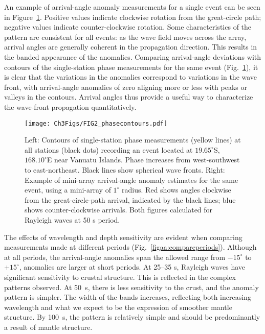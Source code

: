 \documentclass[12pt,oneside]{book}
\newcommand{\degree}[1]{\mbox{$#1^{\circ}$}}
\begin{document}
An example of arrival-angle anomaly measurements for a single event can be seen in Figure~\ref{figaa:phasecontours}. Positive values indicate clockwise rotation from the great-circle path; negative values indicate counter-clockwise rotation. Some characteristics of the pattern are consistent for all events: as the wave field moves across the array, arrival angles are generally coherent in the propagation direction. This results in the banded appearance of the anomalies. Comparing arrival-angle deviations with contours of the single-station phase measurements for the same event (Fig.~\ref{figaa:phasecontours}), it is clear that the variations in the anomalies correspond to variations in the wave front, with arrival-angle anomalies of zero aligning more or less with peaks or valleys in the contours. Arrival angles thus provide a useful way to characterize the wave-front propagation quantitatively. 

\begin{figure} 
\begin{center}
\texttt{[image: Ch3Figs/FIG2\_phasecontours.pdf]} 
\caption[Comparison of single-station phase contours and arrival-angle anomaly measurements for a single event]{Left: Contours of single-station phase measurements (yellow lines) at all stations (black dots) recording an event located at \degree{19.65}S, \degree{168.10}E near Vanuatu Islands. Phase increases from west-southwest to east-northeast. Black lines show spherical wave fronts. Right: Example of mini-array arrival-angle anomaly estimates for the same event, using a mini-array of \degree{1} radius. Red shows angles clockwise from the great-circle-path arrival, indicated by the black lines; blue shows counter-clockwise arrivals. Both figures calculated for Rayleigh waves at 50 s period. }
\label{figaa:phasecontours}
\end{center}
\end{figure}
%

The effects of wavelength and depth sensitivity are evident when comparing measurements made at different periods (Fig.~\ref{figaa:compareperiods}). Although at all periods, the arrival-angle anomalies span the allowed range from \degree{-15} to \degree{+15}, anomalies are larger at short periods. At 25--35 s, Rayleigh waves have significant sensitivity to crustal structure. This is reflected in the complex patterns observed. At 50~s, there is less sensitivity to the crust, and the anomaly pattern is simpler. The width of the bands increases, reflecting both increasing wavelength and what we expect to be the expression of smoother mantle structure. By 100~s, the pattern is relatively simple and should be predominantly a result of mantle structure. 
\end{document}
